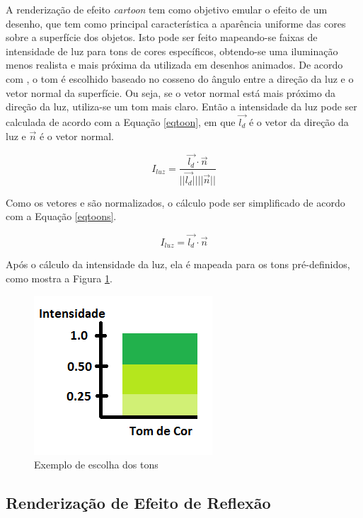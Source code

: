 {	A renderização de efeito \textit{cartoon} tem como objetivo emular o efeito de um desenho, que tem como principal característica a aparência uniforme das cores sobre a superfície dos objetos. Isto pode ser feito mapeando-se faixas de intensidade de luz para tons de cores específicos, obtendo-se uma iluminação menos realista e mais próxima da utilizada em desenhos animados. De acordo com \cite{sbgames}, o tom é escolhido baseado no cosseno do ângulo entre a direção da luz e o vetor normal da superfície. Ou seja, se o vetor normal está mais próximo da direção da luz, utiliza-se um tom mais claro.  Então a intensidade da luz pode ser calculada de acordo com a Equação \ref{eqtoon}, em que $\overrightarrow{l_{d}}$ é o vetor da direção da luz e $\overrightarrow{n}$ é o vetor normal.

	\begin{equation}
		I_ {luz} = \frac{ \overrightarrow{l_{d}} \cdot \overrightarrow{n} } {| | \overrightarrow{l_{d}} | |  | | \overrightarrow{n} | | } 
	\label{eqtoon}
	\end{equation}

	Como os vetores  e  são normalizados, o cálculo pode ser simplificado de acordo com a Equação \ref{eqtoons}.

	\begin{equation}
		I_ {luz} =  \overrightarrow{l_{d}} \cdot \overrightarrow{n}  
	\label{eqtoons}
	\end{equation}

	Após o cálculo da intensidade da luz, ela é mapeada para os tons pré-definidos, como mostra a Figura \ref{tons}.

	\begin{figure}[ht]
	\centering
		\includegraphics[keepaspectratio=true,scale=1.0]{figuras/tomcor.png}
	\caption{Exemplo de escolha dos tons}
	\label{tons}
	\end{figure}

	\subsection{Renderização de Efeito de Reflexão}
	\label{ref_t}

}
